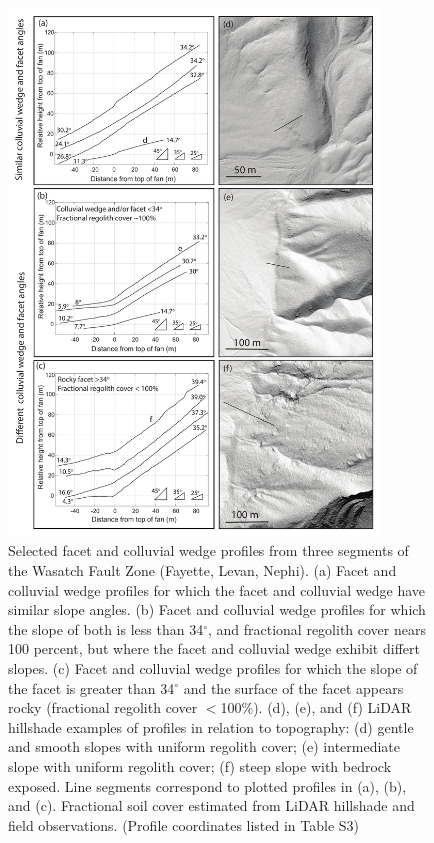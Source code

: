 \begin{figure}[ht!]
\centerline{\includegraphics[width=3.9in]{Figures/FacetSlopes4_bw_facetfan_vertical.pdf}}
\caption{Selected facet and colluvial wedge profiles from
three segments of the Wasatch Fault Zone (Fayette, Levan, Nephi). (a)
Facet and colluvial wedge profiles for which the 
facet and colluvial wedge have similar slope angles. (b) Facet and
colluvial wedge profiles for which the slope of both is less than 34$^\circ$, 
and fractional regolith cover nears 100 percent, but where the facet
and colluvial wedge exhibit differt slopes. (c) Facet and colluvial
wedge profiles for which the slope of the facet is greater than 34$^\circ$
and the surface of the facet appears rocky (fractional regolith cover
$<$100\%). %
(d), (e), and (f) LiDAR hillshade examples of profiles in relation to
topography: (d) gentle and smooth slopes with uniform regolith cover;
(e) intermediate slope with uniform regolith cover; (f) steep
slope with bedrock exposed. Line segments
correspond to plotted profiles in (a), (b), and (c). Fractional soil
cover estimated from LiDAR hillshade and field observations. (Profile coordinates listed in Table S3)} 
\label{fig:profiles2}
\end{figure}


